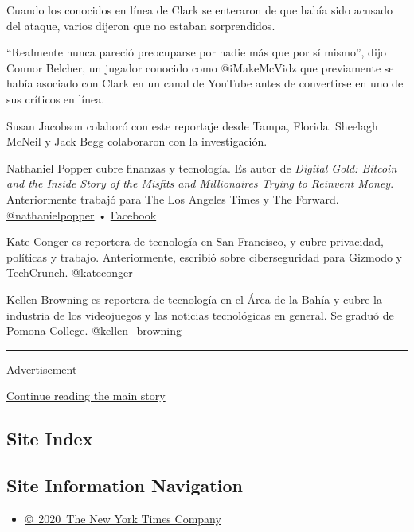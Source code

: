 Cuando los conocidos en línea de Clark se enteraron de que había sido
acusado del ataque, varios dijeron que no estaban sorprendidos.

``Realmente nunca pareció preocuparse por nadie más que por sí mismo'',
dijo Connor Belcher, un jugador conocido como @iMakeMcVidz que
previamente se había asociado con Clark en un canal de YouTube antes de
convertirse en uno de sus críticos en línea.

Susan Jacobson colaboró con este reportaje desde Tampa, Florida.
Sheelagh McNeil y Jack Begg colaboraron con la investigación.

Nathaniel Popper cubre finanzas y tecnología. Es autor de \emph{Digital
Gold: Bitcoin and the Inside Story of the Misfits and Millionaires
Trying to Reinvent Money}. Anteriormente trabajó para The Los Angeles
Times y The Forward.
\href{https://twitter.com/nathanielpopper}{@nathanielpopper} •
\href{https://www.facebookcorewwwi.onion/nathanielvpopper}{Facebook}

Kate Conger es reportera de tecnología en San Francisco, y cubre
privacidad, políticas y trabajo. Anteriormente, escribió sobre
ciberseguridad para Gizmodo y TechCrunch.
\href{https://twitter.com/kateconger}{@kateconger}

Kellen Browning es reportera de tecnología en el Área de la Bahía y
cubre la industria de los videojuegos y las noticias tecnológicas en
general. Se graduó de Pomona College.
\href{https://twitter.com/kellen_browning}{@kellen\_browning}

\begin{center}\rule{0.5\linewidth}{\linethickness}\end{center}

Advertisement

\protect\hyperlink{after-bottom}{Continue reading the main story}

\hypertarget{site-index}{%
\subsection{Site Index}\label{site-index}}

\hypertarget{site-information-navigation}{%
\subsection{Site Information
Navigation}\label{site-information-navigation}}

\begin{itemize}
\tightlist
\item
  \href{https://help.nytimes3xbfgragh.onion/hc/en-us/articles/115014792127-Copyright-notice}{©~2020~The
  New York Times Company}
\end{itemize}

